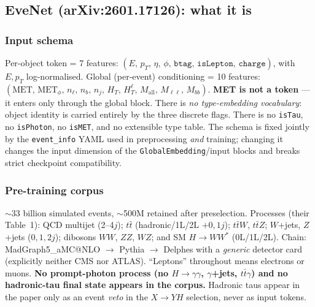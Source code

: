 \documentclass[11pt]{article}
\begin{document}
\subsection{EveNet (arXiv:2601.17126): what it is}
\label{sec:evenet}

\subsubsection{Input schema}
Per-object token = 7 features:
$(E,\,p_T,\,\eta,\,\phi,\,\texttt{btag},\,\texttt{isLepton},\,\texttt{charge})$,
with $E,p_T$ log-normalised. Global (per-event) conditioning = 10 features:
$(\mathrm{MET},\,\mathrm{MET}_\phi,\,n_\ell,\,n_b,\,n_j,\,H_T,\,H_T^\ell,\,
M_{\mathrm{all}},\,M_{\ell\ell},\,M_{bb})$. \textbf{MET is not a token} ---
it enters only through the global block. There is \emph{no type-embedding
vocabulary}: object identity is carried entirely by the three discrete flags.
There is no \texttt{isTau}, no \texttt{isPhoton}, no \texttt{isMET}, and no
extensible type table. The schema is fixed jointly by the
\texttt{event\_info} YAML used in preprocessing \emph{and} training; changing
it changes the input dimension of the \texttt{GlobalEmbedding}/input blocks
and breaks strict checkpoint compatibility.

\subsubsection{Pre-training corpus}
$\sim$33 billion simulated events, $\sim$500M retained after preselection.
Processes (their Table~1): QCD multijet (2--4$j$); $t\bar t$
(hadronic/1L/2L $+0,1j$); $t\bar tW$, $t\bar tZ$; $W$+jets, $Z$+jets
($0,1,2j$); dibosons $WW$, $ZZ$, $WZ$; and SM $H\to WW^*$ (0L/1L/2L).
Chain: MadGraph5\_aMC@NLO $\to$ Pythia $\to$ Delphes with a \emph{generic}
detector card (explicitly neither CMS nor ATLAS). ``Leptons'' throughout
means electrons or muons.
\textbf{No prompt-photon process (no $H\to\gamma\gamma$, $\gamma$+jets,
$t\bar t\gamma$) and no hadronic-tau final state appears in the corpus.}
Hadronic taus appear in the paper only as an event \emph{veto} in the
$X\to YH$ selection, never as input tokens.
\end{document}
